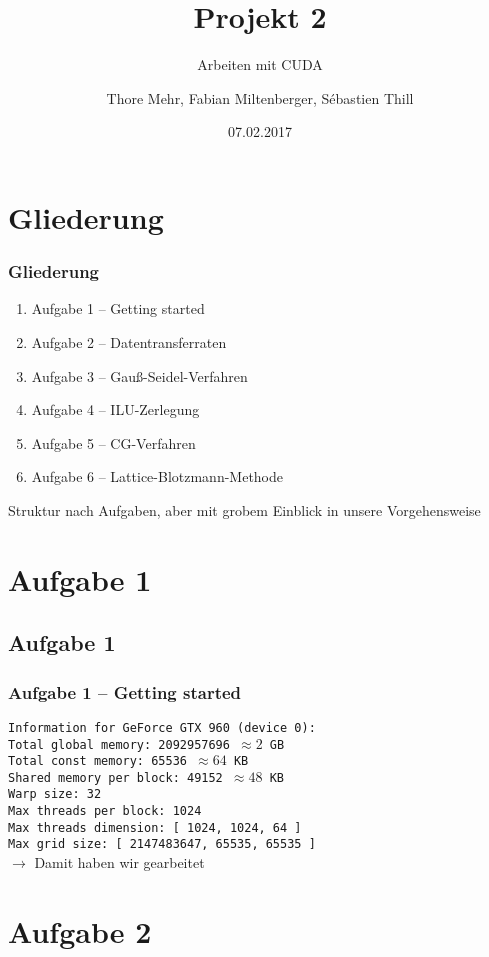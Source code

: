 \documentclass[german,notes,18pt]{beamer}
\title{Projekt 2}
\subtitle{Arbeiten mit CUDA}
\author{Thore Mehr, Fabian Miltenberger, Sébastien Thill}
\date{07.02.2017}
\institute{Lehrstuhl für Rechnerarchitektur und Parallelverarbeitung (ITEC)}
\begin{document}
	
	\frame{\titlepage}
	
	\section{Gliederung}
	\begin{frame}
		\frametitle{Gliederung}
		
		\begin{enumerate}
			\item Aufgabe 1 -- Getting started
			\item Aufgabe 2 -- Datentransferraten
			\item Aufgabe 3 -- Gauß-Seidel-Verfahren
			\item Aufgabe 4 -- ILU-Zerlegung
			\item Aufgabe 5 -- CG-Verfahren
			\item Aufgabe 6 -- Lattice-Blotzmann-Methode
		\end{enumerate}
		Struktur nach Aufgaben, aber mit grobem Einblick in unsere Vorgehensweise
	\end{frame}

	\section{Aufgabe 1}
	\subsection{Aufgabe 1}
	\begin{frame}
		\frametitle{Aufgabe 1 -- Getting started}
		
		\texttt{Information for GeForce GTX 960 (device 0): \\
		Total global  memory: 2092957696 $\approx2$ GB \\
		Total const memory: 65536 $\approx64$ KB \\
		Shared memory per block: 49152 $\approx48$ KB \\
		Warp size: 32 \\
		Max threads per block: 1024 \\
		Max threads dimension: [ 1024, 1024, 64 ] \\
		Max grid size: [ 2147483647, 65535, 65535 ]} \\
		\vspace{2em}
		$\rightarrow$ Damit haben wir gearbeitet
	\end{frame}

	\section{Aufgabe 2}
\end{document}

